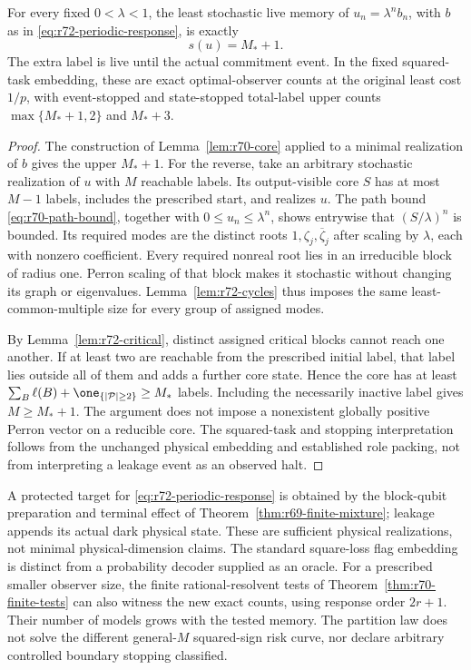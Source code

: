 \begin{theorem}\label{thm:r72-periodic-leakage}
For every fixed $0<\lambda<1$, the least stochastic live memory of $u_n=\lambda^nb_n$, with $b$ as in \eqref{eq:r72-periodic-response}, is exactly
\[
 s(u)=M_*+1.
\]
The extra label is live until the actual commitment event. In the fixed squared-task embedding, these are exact optimal-observer counts at the original least cost $1/p$, with event-stopped and state-stopped total-label upper counts $\max\{M_*+1,2\}$ and $M_*+3$.
\end{theorem}
\begin{proof}
The construction of Lemma~\ref{lem:r70-core} applied to a minimal realization of $b$ gives the upper $M_*+1$. For the reverse, take an arbitrary stochastic realization of $u$ with $M$ reachable labels. Its output-visible core $S$ has at most $M-1$ labels, includes the prescribed start, and realizes $u$. The path bound \eqref{eq:r70-path-bound}, together with $0\le u_n\le\lambda^n$, shows entrywise that $(S/\lambda)^n$ is bounded. Its required modes are the distinct roots $1,\zeta_j,\overline\zeta_j$ after scaling by $\lambda$, each with nonzero coefficient. Every required nonreal root lies in an irreducible block of radius one. Perron scaling of that block makes it stochastic without changing its graph or eigenvalues. Lemma~\ref{lem:r72-cycles} thus imposes the same least-common-multiple size for every group of assigned modes.

By Lemma~\ref{lem:r72-critical}, distinct assigned critical blocks cannot reach one another. If at least two are reachable from the prescribed initial label, that label lies outside all of them and adds a further core state. Hence the core has at least $\sum_B\ell(B)+\one_{\{|\mathcal P|\ge2\}}\ge M_*$ labels. Including the necessarily inactive label gives $M\ge M_*+1$. The argument does not impose a nonexistent globally positive Perron vector on a reducible core. The squared-task and stopping interpretation follows from the unchanged physical embedding and established role packing, not from interpreting a leakage event as an observed halt.
\end{proof}

A protected target for \eqref{eq:r72-periodic-response} is obtained by the block-qubit preparation and terminal effect of Theorem~\ref{thm:r69-finite-mixture}; leakage appends its actual dark physical state. These are sufficient physical realizations, not minimal physical-dimension claims. The standard square-loss flag embedding is distinct from a probability decoder supplied as an oracle. For a prescribed smaller observer size, the finite rational-resolvent tests of Theorem~\ref{thm:r70-finite-tests} can also witness the new exact counts, using response order $2r+1$. Their number of models grows with the tested memory. The partition law does not solve the different general-$M$ squared-sign risk curve, nor declare arbitrary controlled boundary stopping classified.

